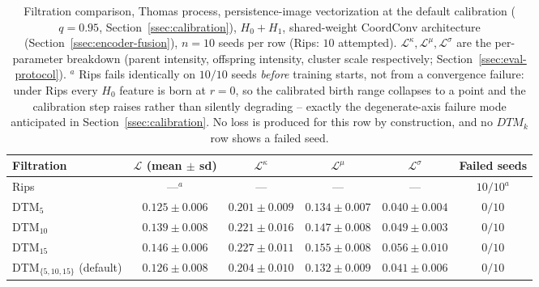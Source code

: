 \documentclass[11pt,letterpaper]{article}
\newcommand{\1}{\mathds{1}}
\theoremstyle{plain}
\theoremstyle{definitioncolon}
\begin{document}
\begin{table}[tbp]
\centering
\footnotesize
\begin{tabular}{lccccc}
\toprule
Filtration & $\mathcal{L}$ (mean $\pm$ sd) & $\mathcal{L}^\kappa$ & $\mathcal{L}^\mu$ & $\mathcal{L}^\sigma$ & Failed seeds \\
\midrule
Rips                          & ---$^a$            & ---               & ---               & ---               & $10/10^a$ \\
DTM$_5$                       & $0.125 \pm 0.006$  & $0.201 \pm 0.009$ & $0.134 \pm 0.007$ & $0.040 \pm 0.004$ & $0/10$ \\
DTM$_{10}$                    & $0.139 \pm 0.008$  & $0.221 \pm 0.016$ & $0.147 \pm 0.008$ & $0.049 \pm 0.003$ & $0/10$ \\
DTM$_{15}$                    & $0.146 \pm 0.006$  & $0.227 \pm 0.011$ & $0.155 \pm 0.008$ & $0.056 \pm 0.010$ & $0/10$ \\
DTM$_{\{5,10,15\}}$ (default) & $0.126 \pm 0.008$  & $0.204 \pm 0.010$ & $0.132 \pm 0.009$ & $0.041 \pm 0.006$ & $0/10$ \\
\bottomrule
\end{tabular}
\caption{Filtration comparison, Thomas process, persistence-image
vectorization at the default calibration ($q=0.95$, Section~\ref{ssec:calibration}),
$H_0{+}H_1$, shared-weight CoordConv architecture
(Section~\ref{ssec:encoder-fusion}), $n=10$ seeds per row (Rips: $10$
attempted). $\mathcal{L}^\kappa,\mathcal{L}^\mu,\mathcal{L}^\sigma$ are the
per-parameter breakdown (parent intensity, offspring intensity, cluster
scale respectively; Section~\ref{ssec:eval-protocol}). $^a$ Rips fails
identically on $10/10$ seeds \emph{before} training starts, not from a
convergence failure: under Rips every $H_0$ feature is born at $r=0$, so the
calibrated birth range collapses to a point and the calibration step raises
rather than silently degrading -- exactly the degenerate-axis failure mode
anticipated in Section~\ref{ssec:calibration}. No loss is produced for this
row by construction, and no $DTM_k$ row shows a failed seed.}
\label{tab:filtration-comparison}
\end{table}
\end{document}
